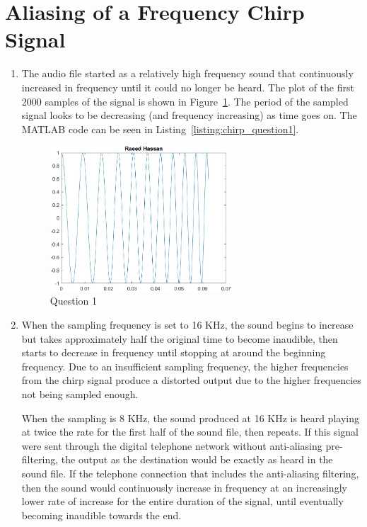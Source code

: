 \documentclass[12pt]{article}
\begin{document}
\section*{Aliasing of a Frequency Chirp Signal}
\begin{enumerate}
    \item
    The audio file started as a relatively high frequency sound that continuously increased in frequency until it could no longer be heard. The plot of the first 2000 samples of the signal is shown in Figure~\ref{fig:chirp_question1}. The period of the sampled signal looks to be decreasing (and frequency increasing) as time goes on. The MATLAB code can be seen in Listing~\ref{listing:chirp_question1}.
    
    \begin{figure}[!ht]
        \centering
        \includegraphics[width=0.64\textwidth]{chirp_question1}
        \caption{\label{fig:chirp_question1}Question 1}
    \end{figure}

    \item
    When the sampling frequency is set to 16 KHz, the sound begins to increase but takes approximately half the original time to become inaudible, then starts to decrease in frequency until stopping at around the beginning frequency. Due to an insufficient sampling frequency, the higher frequencies from the chirp signal produce a distorted output due to the higher frequencies not being sampled enough. 
    
    When the sampling is 8 KHz, the sound produced at 16 KHz is heard playing at twice the rate for the first half of the sound file, then repeats. If this signal were sent through the digital telephone network without anti-aliasing pre-filtering, the output as the destination would be exactly as heard in the sound file. If the telephone connection that includes the anti-aliasing filtering, then the sound would continuously increase in frequency at an increasingly lower rate of increase for the entire duration of the signal, until eventually becoming inaudible towards the end.
    

\end{enumerate}
\end{document}
